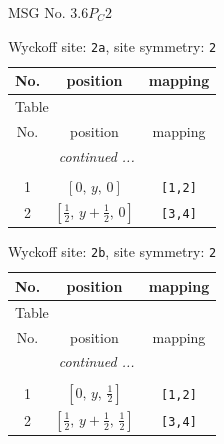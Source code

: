 \documentclass[fleqn,8pt]{jsarticle}
\begin{document}
\setcounter{MaxMatrixCols}{32}

\renewcommand{\tablename}{Table~}
\renewcommand{\figurename}{Figure~}
\begin{center}
\LARGE
MSG No. 3.6\quad$P_{C}2$
\end{center}
\renewcommand{\arraystretch}{1.2}
\begin{longtable}{ccc}
\caption{Wyckoff site: {\tt 2a}, site symmetry: {\tt 2}}
 \\
 \hline \hline
No. & position & mapping \\ \hline \endfirsthead

\multicolumn{2}{l}{\tablename\ \thetable{}} \\
 \hline \hline
No. & position & mapping \\ \hline \endhead

 \hline \hline
\multicolumn{2}{r}{\footnotesize\it continued ...} \\ \endfoot

 \hline \hline
\multicolumn{2}{r}{} \\ \endlastfoot

1 & $\left[ 0,\, y,\, 0 \right]$ & {\tt [1,2]} \\ \hline
2 & $\left[ \frac{1}{2},\, y + \frac{1}{2},\, 0 \right]$ & {\tt [3,4]} \\
\end{longtable}
\renewcommand{\arraystretch}{1.2}
\begin{longtable}{ccc}
\caption{Wyckoff site: {\tt 2b}, site symmetry: {\tt 2}}
 \\
 \hline \hline
No. & position & mapping \\ \hline \endfirsthead

\multicolumn{2}{l}{\tablename\ \thetable{}} \\
 \hline \hline
No. & position & mapping \\ \hline \endhead

 \hline \hline
\multicolumn{2}{r}{\footnotesize\it continued ...} \\ \endfoot

 \hline \hline
\multicolumn{2}{r}{} \\ \endlastfoot

1 & $\left[ 0,\, y,\, \frac{1}{2} \right]$ & {\tt [1,2]} \\ \hline
2 & $\left[ \frac{1}{2},\, y + \frac{1}{2},\, \frac{1}{2} \right]$ & {\tt [3,4]} \\
\end{longtable}
\renewcommand{\arraystretch}{1.2}
\end{document}

